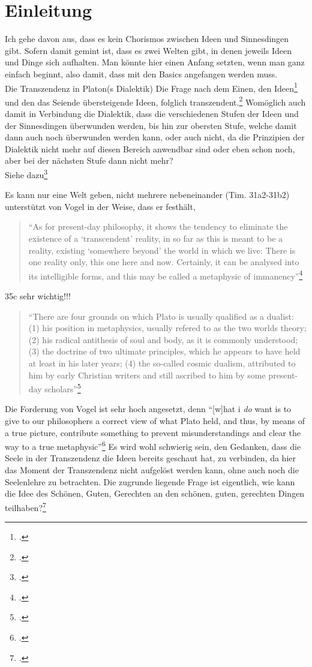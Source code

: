 \documentclass[12pt]{article}
\newcommand*{\zitatblock}[1]{%
    \begin{quote}
    \fontsize{10}{12}\selectfont
    \setlength{\parskip}{1.0em}
    #1
    \end{quote}
}
\begin{document}
\section{Einleitung}
Ich gehe davon aus, dass es kein Chorismos zwischen Ideen und Sinnesdingen gibt. Sofern damit gemint ist, dass es zwei Welten gibt, in denen jeweils Ideen und Dinge sich aufhalten. 
Man könnte hier einen Anfang setzten, wenn man ganz einfach beginnt, also damit, dass mit den Basics angefangen werden muss.\\
Die Transzendenz in Platon(s Dialektik) 
Die Frage nach dem Einen, den Ideen\footcite[][]{Staudacher} und den das Seiende übersteigende Ideen, folglich transzendent.\footcite[][]{Bordt}
Womöglich auch damit in Verbindung die Dialektik, dass die verschiedenen Stufen der Ideen und der Sinnesdingen überwunden werden, bis hin zur obersten Stufe, welche damit dann auch noch überwunden werden kann, oder auch nicht, da die Prinzipien der Dialektik nicht mehr auf diesen Bereich anwendbar sind oder eben schon noch, aber bei der nächsten Stufe dann nicht mehr?\\
Siehe dazu\footcite[vgl.][S. 104ff]{Hirschberger}

Es kann nur eine Welt geben, nicht mehrere nebeneinander (Tim. 31a2-31b2)
unterstützt von Vogel in der Weise, dass er festhält, \zitatblock{\enquote{As for present-day philosophy, it shows the tendency to eliminate the existence of a \enquote{transcendent} reality, in so far as this is meant to be a reality, existing \enquote{somewhere beyond} the world in which we live: There is one reality only, this one here and now. Certainly, it can be analysed into its intelligible forms, and this may be called a metaphysic of immanency}\footcite[][S. 161]{Vogel}}
35c sehr wichtig!!!
\zitatblock{\enquote{There are four grounds on which Plato is usually qualified as a dualist: (1) his position in metaphysics, usually refered to as the two worlds theory; (2) his radical antithesis of soul and body, as it is commonly understood; (3) the doctrine of two ultimate principles, which he appears to have held at least in his later years; (4) the so-called cosmic dualism, attributed to him by early Christian writers and still ascribed to him by some present-day scholars}\footcite[][S. 159]{Vogel}}
Die Forderung von Vogel ist sehr hoch angesetzt, denn \enquote{[w]hat i \emph{do} want is to give to our philosophers a correct view of what Plato held, and thus, by means of a true picture, contribute something to prevent misunderstandings and clear the way to a true metaphysic}\footcite[vgl.][S. 161]{Vogel}
Es wird wohl schwierig sein, den Gedanken, dass die Seele in der Transzendenz die Ideen bereits geschaut hat, zu verbinden, da hier das Moment der Transzendenz nicht aufgelöst werden kann, ohne auch noch die Seelenlehre zu betrachten.
Die zugrunde liegende Frage ist eigentlich, wie kann die Idee des Schönen, Guten, Gerechten an den schönen, guten, gerechten Dingen teilhaben?\footcite[vgl.][S. 16]{Martin73}
\end{document}

